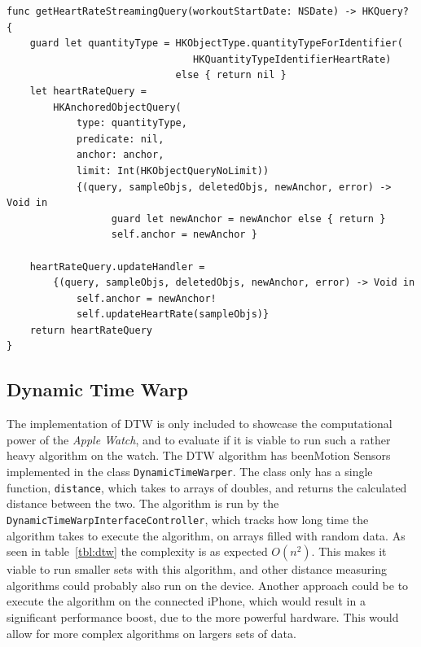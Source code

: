 \begin{lstlisting}[label={lst:streaminghr},caption={Setting up a streaming heart
rate query for continuous handling of samples generated by the heart rate
sensor.},basicstyle=\small]
func getHeartRateStreamingQuery(workoutStartDate: NSDate) -> HKQuery? {
    guard let quantityType = HKObjectType.quantityTypeForIdentifier(
                                HKQuantityTypeIdentifierHeartRate) 
                             else { return nil }
    let heartRateQuery = 
        HKAnchoredObjectQuery(
            type: quantityType,
            predicate: nil,
            anchor: anchor,
            limit: Int(HKObjectQueryNoLimit))
            {(query, sampleObjs, deletedObjs, newAnchor, error) -> Void in
                  guard let newAnchor = newAnchor else { return }
                  self.anchor = newAnchor }

    heartRateQuery.updateHandler = 
        {(query, sampleObjs, deletedObjs, newAnchor, error) -> Void in
            self.anchor = newAnchor!
            self.updateHeartRate(sampleObjs)}
    return heartRateQuery
}
\end{lstlisting}

\subsection{Dynamic Time Warp}
The implementation of DTW is only included to showcase the computational power of
the \textit{Apple Watch}, and to evaluate if it is viable to run such a rather
heavy algorithm on the watch.
The DTW algorithm has beenMotion Sensors implemented in the class
\texttt{DynamicTimeWarper}. The class only has a single function,
    \texttt{distance}, which takes to arrays of doubles, and returns the
    calculated distance between the two. The algorithm is run by the
    \texttt{DynamicTimeWarpInterfaceController}, which tracks how long time the
    algorithm takes to execute the algorithm, on arrays filled with random data. 
As seen in table~\ref{tbl:dtw} the complexity is as expected $O(n^2)$.
This makes it viable to run smaller sets with this algorithm, and other distance
measuring algorithms could probably also run on the device.
Another approach could be to execute the algorithm on the connected iPhone,
which would result in a significant performance boost, due to the more powerful
hardware. This would allow for more complex algorithms on largers sets of data.


